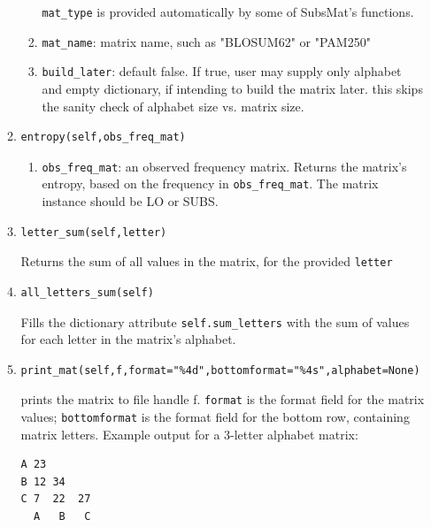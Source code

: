 \documentclass{report}
\begin{document}
\begin{enumerate}
\begin{enumerate}
\begin{enumerate}
      \verb|mat_type| is provided automatically by some of SubsMat's functions.

      \item \verb|mat_name|: matrix name, such as "BLOSUM62" or "PAM250"

      \item \verb|build_later|: default false. If true, user may supply only alphabet and empty dictionary, if intending to build the matrix later. this skips the sanity check of alphabet size vs. matrix size.

    \end{enumerate}

    \item
\begin{verbatim}
entropy(self,obs_freq_mat)
\end{verbatim}

    \begin{enumerate}
      \item \verb|obs_freq_mat|: an observed frequency matrix. Returns the matrix's entropy, based on the frequency in  \verb|obs_freq_mat|. The matrix instance should be LO or SUBS.
    \end{enumerate}

    \item
\begin{verbatim}
letter_sum(self,letter)
\end{verbatim}

    Returns the sum of all values in the matrix, for the provided \verb|letter|

    \item
\begin{verbatim}
all_letters_sum(self)
\end{verbatim}
   
    Fills the  dictionary attribute \verb|self.sum_letters| with the sum of values for each letter in the matrix's alphabet.

    \item
\begin{verbatim}
print_mat(self,f,format="%4d",bottomformat="%4s",alphabet=None)
\end{verbatim}

    prints the matrix to file handle f. \verb|format| is the format field for the matrix values; \verb|bottomformat| is the format field for the bottom row, containing matrix letters. Example output for a 3-letter alphabet matrix:

\begin{verbatim}
A 23
B 12 34
C 7  22  27
  A   B   C
\end{verbatim}


\end{enumerate}
\end{enumerate}
\end{document}
